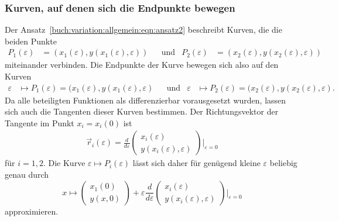 \subsubsection{Kurven, auf denen sich die Endpunkte bewegen}
Der Ansatz~\eqref{buch:variation:allgemein:eqn:ansatz2} beschreibt
Kurven, die die beiden Punkte
\begin{align*}
P_1(\varepsilon)
&=
(x_1(\varepsilon),y(x_1(\varepsilon),\varepsilon))
&&\text{und}&
P_2(\varepsilon)
&=
(x_2(\varepsilon),y(x_2(\varepsilon),\varepsilon))
\end{align*}
miteinander verbinden.
Die Endpunkte der Kurve bewegen sich also auf den Kurven
\begin{align*}
\varepsilon
&\mapsto
P_1(\varepsilon)
=
(x_1(\varepsilon),y(x_1(\varepsilon),\varepsilon)
&&\text{und}&
\varepsilon
&\mapsto
P_2(\varepsilon)
=
(x_2(\varepsilon),y(x_2(\varepsilon),\varepsilon).
\end{align*}
Da alle beteiligten Funktionen als differenzierbar vorausgesetzt wurden,
lassen sich auch die Tangenten dieser Kurven bestimmen.
Der Richtungsvektor der Tangente im Punkt $x_i=x_i(0)$ ist
\begin{align}
\vec{r}_i(\varepsilon)
=
\frac{d}{d\varepsilon}
\begin{pmatrix}
x_i(\varepsilon)\\
y(x_i(\varepsilon),\varepsilon)
\end{pmatrix}
\bigg|_{\varepsilon=0}
\label{buch:variation:allgemein:eqn:tangential}
\end{align}
für $i=1,2$.
Die Kurve $\varepsilon\mapsto P_i(\varepsilon)$ lässt sich daher für
genügend kleine $\varepsilon$ beliebig genau durch
\[
x\mapsto
\begin{pmatrix}
x_1(0)\\
y(x,0) 
\end{pmatrix}
+
\varepsilon
\frac{d}{d\varepsilon}
\begin{pmatrix}
x_i(\varepsilon)\\
y(x_i(\varepsilon),\varepsilon)
\end{pmatrix}
\bigg|_{\varepsilon=0}
\]
approximieren.

%
%
